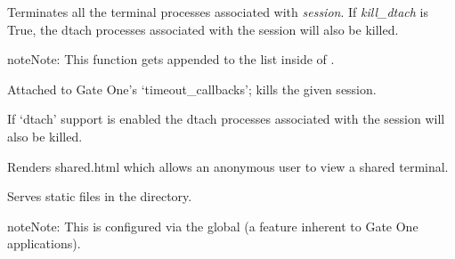 \documentclass[letterpaper,10pt,openany]{sphinxmanual}
\begin{document}
\begin{fulllineitems}
\label{Applications/terminal/app_terminal:app_terminal.kill_session}
Terminates all the terminal processes associated with \emph{session}.  If
\emph{kill\_dtach} is True, the dtach processes associated with the session will
also be killed.

\begin{notice}{note}{Note:}
This function gets appended to the
 list inside of
{\hyperref[Applications/terminal/app_terminal:app_terminal.TerminalApplication.authenticate]{}}.
\end{notice}

\end{fulllineitems}


\begin{fulllineitems}
\label{Applications/terminal/app_terminal:app_terminal.timeout_session}
Attached to Gate One's `timeout\_callbacks'; kills the given session.

If `dtach' support is enabled the dtach processes associated with the
session will also be killed.

\end{fulllineitems}


\begin{fulllineitems}
\label{Applications/terminal/app_terminal:app_terminal.SharedTermHandler}
Renders shared.html which allows an anonymous user to view a shared
terminal.

\end{fulllineitems}


\begin{fulllineitems}
\label{Applications/terminal/app_terminal:app_terminal.TermStaticFiles}
Serves static files in the  directory.

\begin{notice}{note}{Note:}
This is configured via the  global (a feature inherent to
Gate One applications).
\end{notice}

\end{fulllineitems}
\end{document}
